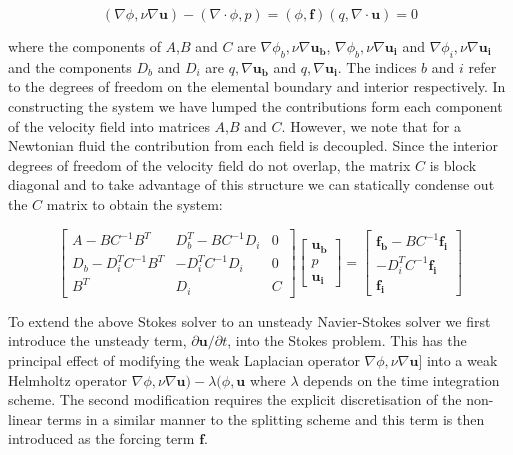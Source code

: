 \begin{subequations}
\begin{equation}
 (\nabla \phi,\nu \nabla \boldsymbol{u}) - (\nabla\cdot\phi,p)=(\phi,\boldsymbol{f})
\end{equation}
\begin{equation}
 (q,\nabla \cdot \boldsymbol{u}) = 0
\end{equation}
\end{subequations}

where the components of $A$,$B$ and $C$ are $\nabla\phi_b,\nu\nabla\boldsymbol{u_b}$, $\nabla\phi_b,\nu\nabla\boldsymbol{u_i}$ and $\nabla\phi_i,\nu\nabla\boldsymbol{u_i}$ and the components $D_b$ and $D_i$ are $q,\nabla\boldsymbol{u_b}$ and $q,\nabla\boldsymbol{u_i}$.
The indices $b$ and $i$ refer to the degrees of freedom on the elemental boundary and interior respectively. In constructing the system we have lumped the contributions form each component of the velocity field into matrices $A$,$B$ and $C$. However, we note that for a Newtonian fluid the contribution from each field is decoupled. Since the interior degrees of freedom of the velocity field do not overlap, the matrix $C$ is block diagonal and to take advantage of this structure we can statically condense out the $C$ matrix to obtain the system:

\begin{equation}
\left[ \begin{array}{ccc}
 A-BC^{-1}B^T & D_b^T-BC^{-1}D_i & 0\\
 D_b-D_i^TC^{-1}B^T & -D_i^TC^{-1}D_i & 0\\
 B^T & D_i & C
 \end{array}\right]
 \left[ \begin{array}{c}
 \boldsymbol{u_b}\\
 p\\
 \boldsymbol{u_i}
 \end{array}\right] =
 \left[ \begin{array}{c}
 \boldsymbol{f_b} - BC^{-1}\boldsymbol{f_i}\\
 -D_i^TC^{-1}\boldsymbol{f_i}\\
 \boldsymbol{f_i}
 \end{array}\right]
 \end{equation}
 
 To extend the above Stokes solver to an unsteady Navier-Stokes solver we first introduce the unsteady term, $\partial \boldsymbol{u}/\partial t$, into the Stokes problem.
This has the principal effect of modifying the weak Laplacian operator $\nabla\phi,\nu\nabla\boldsymbol{u}$] into a weak Helmholtz operator
$\nabla\phi,\nu\nabla\boldsymbol{u})-\lambda(\phi,\boldsymbol{u}$ where $\lambda$ depends on the time integration scheme. The second modification requires the explicit discretisation of the non-linear terms in a similar manner to the splitting scheme and this term is then introduced as the forcing term $\boldsymbol{f}$.

